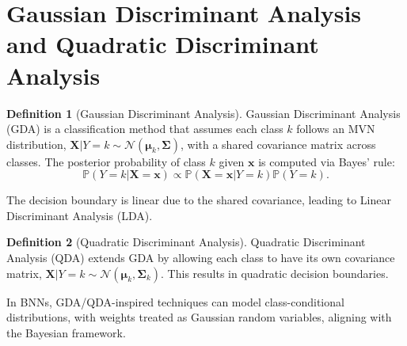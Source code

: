 \documentclass[12pt]{article}
\theoremstyle{plain}
\theoremstyle{definition}
\newtheorem{definition}{Definition}
\newcommand{\N}{\mathcal{N}}
\renewcommand{\P}{\mathbb{P}}
\begin{document}
\section{Gaussian Discriminant Analysis and Quadratic Discriminant Analysis}
\begin{definition}[Gaussian Discriminant Analysis]
Gaussian Discriminant Analysis (GDA) is a classification method that assumes each class \( k \) follows an MVN distribution, \( \mathbf{X} | Y = k \sim \N(\boldsymbol{\mu}_k, \boldsymbol{\Sigma}) \), with a shared covariance matrix across classes. The posterior probability of class \( k \) given \( \mathbf{x} \) is computed via Bayes' rule:
\begin{equation}
\P(Y = k | \mathbf{X} = \mathbf{x}) \propto \P(\mathbf{X} = \mathbf{x} | Y = k) \P(Y = k).
\end{equation}
\end{definition}
The decision boundary is linear due to the shared covariance, leading to Linear Discriminant Analysis (LDA).

\begin{definition}[Quadratic Discriminant Analysis]
Quadratic Discriminant Analysis (QDA) extends GDA by allowing each class to have its own covariance matrix, \( \mathbf{X} | Y = k \sim \N(\boldsymbol{\mu}_k, \boldsymbol{\Sigma}_k) \). This results in quadratic decision boundaries.
\end{definition}
In BNNs, GDA/QDA-inspired techniques can model class-conditional distributions, with weights treated as Gaussian random variables, aligning with the Bayesian framework.
\end{document}
